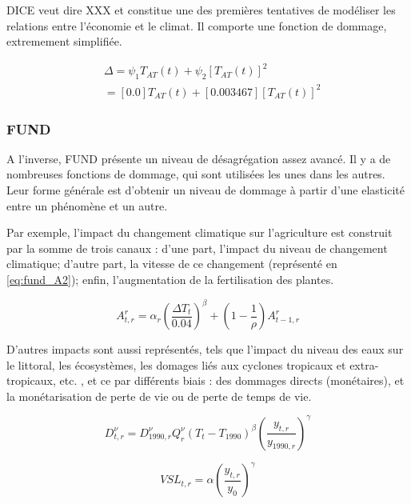 DICE veut dire XXX et constitue une des premières tentatives de modéliser les relations entre l'économie et le climat. Il comporte une fonction de dommage, extremement simplifiée. 

\begin{equation}
\begin{array}{ll}
    & \displaystyle  \Delta = \psi_{1}T_{AT}(t) + \psi_{2}[T_{AT}(t)]^{2} \\
    & = [0.0]T_{AT}(t) + [0.003467][T_{AT}(t)]^{2}
\end{array}
\label{eq:df_dice2023}
\end{equation}

\subsubsection{FUND} 

A l'inverse, FUND présente un niveau de désagrégation assez avancé. Il y a de nombreuses fonctions de dommage, qui sont utilisées les unes dans les autres. Leur forme générale est d'obtenir un niveau de dommage à partir d'une elasticité entre un phénomène et un autre. 

Par exemple, l'impact du changement climatique sur l'agriculture est construit par la somme de trois canaux : d'une part, l'impact du niveau de changement climatique; d'autre part, la vitesse de ce changement (représenté en \ref{eq:fund_A2}); enfin, l'augmentation de la fertilisation des plantes. 

\begin{equation}
    A_{t,r}^{r}=\alpha_{r}\left(\frac{\Delta T_{t}}{0.04}\right)^{\beta}+\left(1-\frac{1}{\rho}\right)A_{t-1,r}^{r}
    \label{eq:fund_A2}
\end{equation}

D'autres impacts sont aussi représentés, tels que l'impact du niveau des eaux sur le littoral, les écosystèmes, les domages liés aux cyclones tropicaux et extra-tropicaux, etc. , et ce par différents biais : des dommages directs (monétaires), et la monétarisation de perte de vie ou de perte de temps de vie. 

\begin{equation}
    D_{t,r}^{\nu}=D_{1990,r}^{\nu}Q_{r}^{\nu}\left(T_{t}-T_{1990}\right)^{\beta}\left(\frac{y_{t,r}}{y_{1990,r}}\right)^{\gamma}
    \label{eq:fund_HV}
\end{equation}

\begin{equation}
    V S L_{t,r}=\alpha\left(\frac{y_{t,r}}{y_{0}}\right)^{\gamma}
    \label{eq:VSL}
\end{equation}

